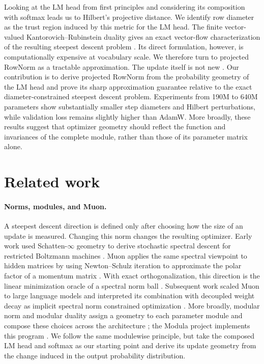 \documentclass[anon]{opt2026} %
\begin{document}
Looking at the LM head from first principles and considering its composition with softmax leads us to Hilbert's projective distance.
We identify row diameter as the trust region induced by this metric for the LM head.
The finite vector-valued Kantorovich--Rubinstein duality gives an exact vector-flow characterization of the resulting steepest descent problem \citep{ciosmak2021optimaltransportvectormeasures, robertson2025generalizationwassersteindistancebeckmann}.
Its direct formulation, however, is computationally expensive at vocabulary scale.
We therefore turn to projected RowNorm as a tractable approximation. The update itself is not new \citep{lau2026symmetry, pethick2025trainingdeeplearningmodels}.
Our contribution is to derive projected RowNorm from the probability geometry of the LM head and prove its sharp approximation guarantee relative to the exact diameter-constrained steepest descent problem.
Experiments from 190M to 640M parameters show substantially smaller step diameters and Hilbert perturbations, while validation loss remains slightly higher than AdamW.
More broadly, these results suggest that optimizer geometry should reflect the function and invariances of the complete module, rather than those of its parameter matrix alone.



\newpage
\clearpage
\appendix


\section{Related work}
\label{app:related-work}


\paragraph{Norms, modules, and Muon.}
A steepest descent direction is defined only after choosing how the size of an
update is measured. Changing this norm changes the resulting optimizer. Early
work used Schatten-$\infty$ geometry to derive stochastic spectral descent for
restricted Boltzmann machines \citep{pmlr-v38-carlson15}. Muon applies the
same spectral viewpoint to hidden matrices by using Newton--Schulz iteration
to approximate the polar factor of a momentum matrix
\citep{jordan2024muon}. With exact orthogonalization, this direction is the
linear minimization oracle of a spectral norm ball
\citep{bernstein2024old,pethick2025trainingdeeplearningmodels}. Subsequent work
scaled Muon to large language models \citep{liu2025muon} and interpreted its
combination with decoupled weight decay as implicit spectral norm constrained
optimization \citep{chen2025muonoptimizesspectralnorm}. More broadly, modular
norm and modular duality \citep{modula-docs} assign a geometry to each parameter module and
compose these choices across the architecture
\citep{large2024scalable,bernstein2024modular}; the Modula project implements
this program \citep{modula-docs}. We follow the same modulewise principle, but
take the composed LM head and softmax as our starting point and derive its
update geometry from the change induced in the output probability
distribution.
\end{document}

